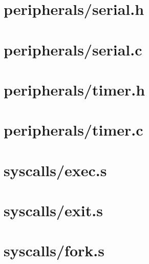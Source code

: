 \section{peripherals/serial.h} \label{sec:serial.h}


\section{peripherals/serial.c} \label{sec:serial.c}


\section{peripherals/timer.h} \label{sec:timer.h}


\section{peripherals/timer.c} \label{sec:timer.c}



\section{syscalls/exec.s} \label{sec:exec.s}


\section{syscalls/exit.s} \label{sec:exit.s}


\section{syscalls/fork.s} \label{sec:fork.s}
